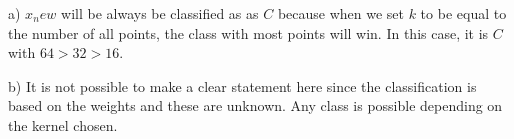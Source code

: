 %
%
%
\begin{flushleft}
  a) $x_new$ will be always be classified as as $C$ because when we set $k$ to be equal to the number of all points, the class with most points will win. In this case, it is $C$ with $64 > 32 > 16$.
\end{flushleft}
\begin{flushleft}
  b) It is not possible to make a clear statement here since the classification is based on the weights and these are unknown. Any class is possible depending on the kernel chosen.
\end{flushleft}
